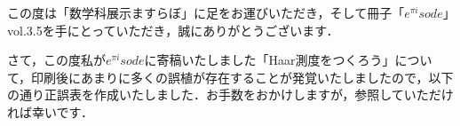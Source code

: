 


この度は「数学科展示ますらぼ」に足をお運びいただき，そして冊子「$e^{\pi i}sode$」vol.3.5を手にとっていただき，誠にありがとうございます．

さて，この度私が$e^{\pi i}sode$に寄稿いたしました「Haar測度をつくろう」について，印刷後にあまりに多くの誤植が存在することが発覚いたしましたので，以下の通り正誤表を作成いたしました．お手数をおかけしますが，参照していただければ幸いです．

